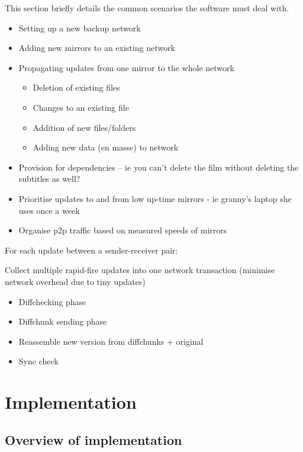 \documentclass[12pt,a4paper,]{adreport}
\begin{document}
This section briefly details the common scenarios the software must deal with.

\begin{itemize}
\itemsep1pt\parskip0pt
\item
  Setting up a new backup network
\item
  Adding new mirrors to an existing network
\item
  Propagating updates from one mirror to the whole network

  \begin{itemize}
  \itemsep1pt\parskip0pt
  \item
    Deletion of existing files
  \item
    Changes to an existing file
  \item
    Addition of new files/folders
  \item
    Adding new data (en masse) to network
  \end{itemize}
\item
  Provision for dependencies -- ie you can't delete the film without
  deleting the subtitles as well?
\item
  Prioritise updates to and from low up-time mirrors - ie granny's
  laptop she uses once a week
\item
  Organise p2p traffic based on measured speeds of mirrors
\end{itemize}

For each update between a sender-receiver pair:

Collect multiple rapid-fire updates into one network transaction
(minimise network overhead due to tiny updates)

\begin{itemize}
\itemsep1pt\parskip0pt
\item
  Diffchecking phase
\item
  Diffchunk sending phase
\item
  Reassemble new version from diffchunks + original
\item
  Sync check
\end{itemize}

\chapter{Implementation}\label{implementation}

\section{Overview of implementation}\label{overview-of-implementation}
\end{document}
